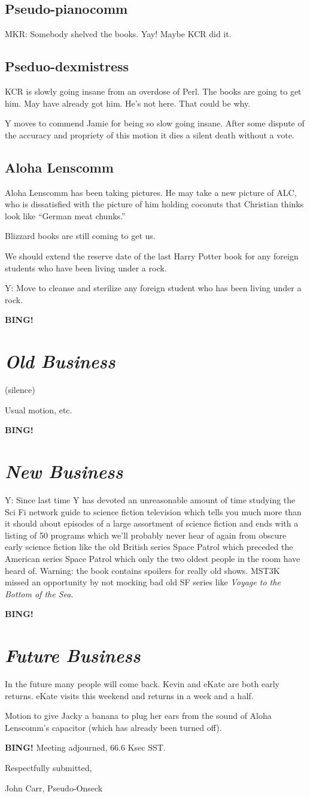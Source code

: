 \documentclass[10pt]{article}
\newcommand{\bing}{{\bf BING!} }
\newcommand{\goto}[1]{\bing \vskip 12pt \section*{{\em{#1}}}}
\begin{document}
\subsection*{Pseudo-pianocomm}
MKR: Somebody shelved the books.  Yay!  Maybe KCR did it.

\subsection*{Pseduo-dexmistress}
KCR is slowly going insane from an overdose of Perl.  The books are
going to get him.  May have already got him.  He's not here.  That
could be why.

Y moves to commend Jamie for being so slow going insane.  After some
dispute of the accuracy and propriety of this motion it dies a silent
death without a vote.

\subsection*{Aloha Lenscomm}
Aloha Lenscomm has been taking pictures.  He may take a new picture
of ALC, who is dissatisfied with the picture of him holding coconuts
that Christian thinks look like ``German meat chunks.''

Blizzard books are still coming to get us.

We should extend the reserve date of the last Harry Potter book for any
foreign students who have been living under a rock.

Y: Move to cleanse and sterilize any foreign student who has been living
under a rock.

\goto{Old Business}

(silence)

Usual motion, etc.

\goto{New Business}

Y: Since last time Y has devoted an unreasonable amount of time studying
the Sci Fi network guide to science fiction television which tells you much
more than it should about episodes of a large assortment of science fiction
and ends with a listing of 50 programs which we'll probably never hear of again
from obscure early science fiction like the old British series Space Patrol
which preceded the American series Space Patrol which only the two oldest
people in the room have heard of.  Warning: the book contains spoilers for
really old shows.  MST3K missed an opportunity by not mocking bad old SF
series like {\it Voyage to the Bottom of the Sea}.

\goto{Future Business}

In the future many people will come back.  Kevin and eKate are both
early returns.  eKate visits this weekend and returns in a week and
a half.

Motion to give Jacky a banana to plug her ears from the sound of
Aloha Lenscomm's capacitor (which has already been turned off).

\bing
\noindent
Meeting adjourned, 66.6 Ksec SST.

\vspace{18pt}

\centerline{Respectfully submitted,}
\centerline{John Carr, Pseudo-Onseck}
\end{document}
